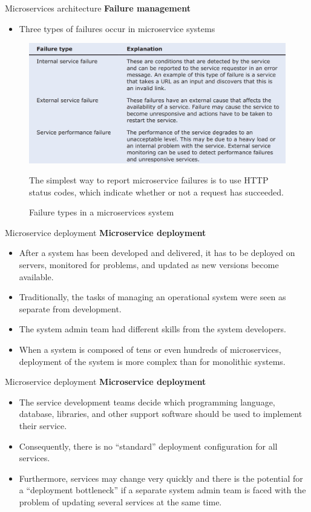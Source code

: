 \documentclass{beamer}
\begin{document}
\begin{frame}{Microservices architecture}
	\textbf{Failure management}
	\begin{itemize}
		\item Three types of failures occur in microservice systems
	\end{itemize}
	\begin{figure}
	\includegraphics[scale=.35]{img/m5_14}
	\caption{Failure types in a microservices system}
	The simplest way to report microservice failures is to use HTTP status codes, which indicate whether or 
	not a request has succeeded.
\end{figure}
\end{frame}
\begin{frame}{Microservice deployment}
	\textbf{Microservice deployment}
	\begin{itemize}
		\item After a system has been developed and delivered, it has to be deployed on servers, monitored for problems, and updated as new versions become available. 
		\item Traditionally, the tasks of managing an operational system were seen as separate from development. 
		\item The system admin team had different skills from the system developers. 
		\item When a system is composed of tens or even hundreds of microservices, deployment of the system is more complex than for monolithic systems.
	\end{itemize}
\end{frame}
\begin{frame}{Microservice deployment}
	\textbf{Microservice deployment}
	\begin{itemize}
		\item The service development teams decide which programming language, database, libraries, and other support software should be used to implement their service. 
		\item Consequently, there is no “standard” deployment configuration for all services. 
		\item Furthermore, services may change very quickly and there is the potential for a “deployment bottleneck” if a separate system admin team is faced with the problem of updating several services at the same time.
		
	\end{itemize}
\end{frame}
\end{document}
